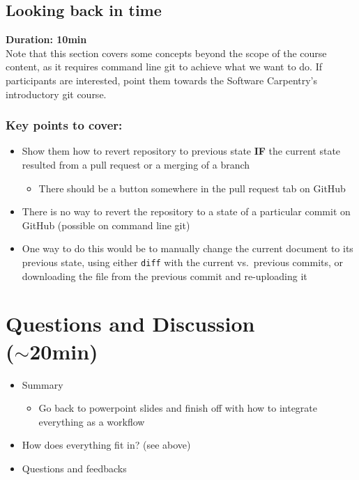 \documentclass[a4paper, 12pt, oneside]{report} %
\begin{document}
\section{Looking back in time}
\label{sec:looking_back_in_time}

{\bfseries Duration: 10min}\\

\noindent
Note that this section covers some concepts beyond the scope of the course content, as it requires command line git to achieve what we want to do.
If participants are interested, point them towards the Software Carpentry's introductory git course.

\subsection*{Key points to cover:}

\begin{itemize}
	\item Show them how to revert repository to previous state \textbf{IF} the current state resulted from a pull request or a merging of a branch
		\begin{itemize}
			\item There should be a button somewhere in the pull request tab on GitHub
		\end{itemize}
	\item There is no way to revert the repository to a state of a particular commit on GitHub (possible on command line git)
	\item One way to do this would be to manually change the current document to its previous state, using either \texttt{diff} with the current vs.\ previous commits, or downloading the file from the previous commit and re-uploading it
\end{itemize}


\chapter{Questions and Discussion\\($\sim$20min)}
\label{cha:questions_and_discussion}

\begin{itemize}
	\item Summary
		\begin{itemize}
			\item Go back to powerpoint slides and finish off with how to integrate everything as a workflow
		\end{itemize}
	\item How does everything fit in? (see above)
	\item Questions and feedbacks
\end{itemize}
\end{document}

